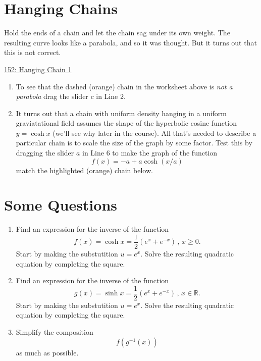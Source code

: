 \documentclass{ximera}
\begin{document}
\section{Hanging Chains}

Hold the ends of a chain and let the chain sag under its own weight. The resulting curve looks like a parabola, and so it was thought. But it turns out that this is not correct. 


\begin{onlineOnly}
    \begin{center}
\end{center}
\end{onlineOnly}

\href{https://www.desmos.com/calculator/tj3dz2cnf0}{152: Hanging Chain 1}


\begin{enumerate} 

\item To see that the dashed (orange) chain in the worksheet above is \emph{not a parabola} drag the slider $c$ in Line 2.

\item It turns out that a chain with uniform density hanging in a uniform graviatational field assumes the shape of the hyperbolic cosine function $y=\cosh x$ (we'll see why later in the course). All that's needed to describe a particular chain is to scale the size of the graph by some factor. Test this by dragging the slider $a$ in Line 6 to make the graph of the function
\[
     f(x) = -a + a\cosh(x/a)
\]
match the highlighted (orange) chain below.
\end{enumerate}


\section{Some Questions}

\begin{question} \label{QLfeenvd}
\begin{enumerate}
\item Find an expression for the inverse of the function
\[
     f(x) = \cosh x = \frac{1}{2}\left( e^x + e^{-x} \right) \, , \, x\geq 0.
\]
Start by making the substutition $u=e^x$. Solve the resulting quadratic equation by completing the square.

\item Find an expression for the inverse of the function
\[
    g(x) = \sinh x = \frac{1}{2}\left( e^x + e^{-x} \right) \, , \, x\in \mathbb{R}.
\]
Start by making the substutition $u=e^x$. Solve the resulting quadratic equation by completing the square.

\item Simplify the composition
\[
       f(g^{-1}(x))
\]
as much as possible.
\end{enumerate}
\end{question}
\end{document}
